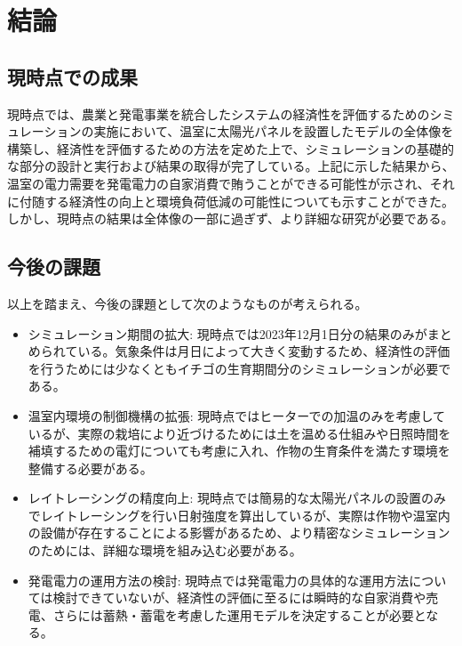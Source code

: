 \documentclass[uplatex,dvipdfmx,nomag,a4paper,oneside,onecolumn,12pt]{bxjsreport} %
\begin{document}
\chapter{結論}
\section{現時点での成果}
現時点では、農業と発電事業を統合したシステムの経済性を評価するためのシミュレーションの実施において、温室に太陽光パネルを設置したモデルの全体像を構築し、経済性を評価するための方法を定めた上で、シミュレーションの基礎的な部分の設計と実行および結果の取得が完了している。上記に示した結果から、温室の電力需要を発電電力の自家消費で賄うことができる可能性が示され、それに付随する経済性の向上と環境負荷低減の可能性についても示すことができた。しかし、現時点の結果は全体像の一部に過ぎず、より詳細な研究が必要である。

\section{今後の課題}
以上を踏まえ、今後の課題として次のようなものが考えられる。
\begin{itemize}
    \item シミュレーション期間の拡大: 現時点では2023年12月1日分の結果のみがまとめられている。気象条件は月日によって大きく変動するため、経済性の評価を行うためには少なくともイチゴの生育期間分のシミュレーションが必要である。
    \item 温室内環境の制御機構の拡張: 現時点ではヒーターでの加温のみを考慮しているが、実際の栽培により近づけるためには土を温める仕組みや日照時間を補填するための電灯についても考慮に入れ、作物の生育条件を満たす環境を整備する必要がある。
    \item レイトレーシングの精度向上: 現時点では簡易的な太陽光パネルの設置のみでレイトレーシングを行い日射強度を算出しているが、実際は作物や温室内の設備が存在することによる影響があるため、より精密なシミュレーションのためには、詳細な環境を組み込む必要がある。
    \item 発電電力の運用方法の検討: 現時点では発電電力の具体的な運用方法については検討できていないが、経済性の評価に至るには瞬時的な自家消費や売電、さらには蓄熱・蓄電を考慮した運用モデルを決定することが必要となる。
\end{itemize}
\end{document}
